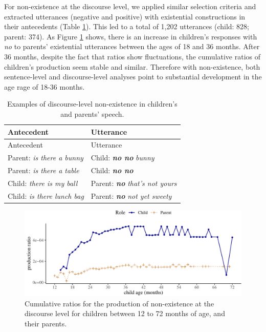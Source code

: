 \documentclass[
  english,
  man,floatsintext]{apa6}
\begin{document}
For non-existence at the discourse level, we applied similar selection criteria and extracted utterances (negative and positive) with existential constructions in their antecedents (Table \ref{tab:disexist}). This led to a total of 1,202 utterances (child: 828; parent: 374). As Figure \ref{fig:existencediscourse} shows, there is an increase in children's responses with \emph{no} to parents' existential utterances between the ages of 18 and 36 months. After 36 months, despite the fact that ratios show fluctuations, the cumulative ratios of children's production seem stable and similar. Therefore with non-existence, both sentence-level and discourse-level analyses point to substantial development in the age rage of 18-36 months.

\begin{longtable}[]{@{}ll@{}}
\caption{\label{tab:disexist} Examples of discourse-level non-existence in children's and parents' speech.}\tabularnewline
\toprule
Antecedent & Utterance \\
\midrule
\endfirsthead
\toprule
Antecedent & Utterance \\
\midrule
\endhead
Parent: \emph{is there a bunny} & Child: \textbf{\emph{no no}} \emph{bunny} \\
Parent: \emph{is there a table} & Child: \textbf{\emph{no no}} \\
Child: \emph{there is my ball} & Parent: \textbf{\emph{no}} \emph{that's not yours} \\
Child: \emph{is there lunch bag} & Parent: \textbf{\emph{no}} \emph{not yet sweety} \\
\bottomrule
\end{longtable}

\begin{figure}[H]

{\centering \includegraphics{neg_construction_article_files/figure-latex/existencediscourse-1} 

}

\caption{Cumulative ratios for the production of non-existence at the discourse level for children between 12 to 72 months of age, and their parents.}\label{fig:existencediscourse}
\end{figure}
\end{document}
